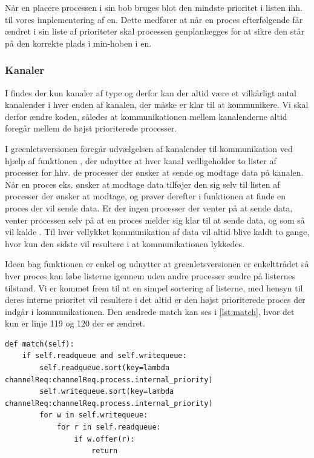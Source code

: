 Når \sched en placere processen i sin bob bruges blot den mindste prioritet i listen ihh. til vores implementering af \sched en. Dette medfører  at når en proces efterfølgende  får ændret i sin liste af prioriteter skal processen genplanlægges for at sikre den står på den korrekte plads i min-hoben i \sched en. 

\subsubsection*{Kanaler}
I \pycsp findes der kun kanaler af type  og derfor kan der altid  være et vilkårligt antal kanalender i hver enden af kanalen, der måske er klar til at kommunikere. Vi skal derfor ændre koden, således at kommunikationen mellem kanalenderne altid foregår mellem de højst prioriterede processer. 

I greenletsversionen foregår udvælgelsen af kanalender til kommunikation ved hjælp af funktionen , der udnytter at  hver kanal vedligeholder to lister af processer for hhv. de processer der ønsker at sende og modtage data på kanalen. Når en proces eks. ønsker at modtage data tilføjer den sig selv til listen af processer der ønsker at modtage, og prøver derefter i  funktionen at finde en proces der vil sende data. Er der ingen processer der venter på at sende data, venter processen selv  på at en proces melder sig klar til at sende data, og som så vil kalde . Til hver vellykket kommunikation af data vil  altid blive kaldt to gange, hvor kun den sidste vil resultere i at kommunikationen lykkedes.

Ideen bag funktionen  er enkel og  udnytter at greenletsversionen er enkelttrådet så hver proces kan løbe listerne igennem uden andre processer ændre på listernes tilstand.  Vi er kommet frem til at  en simpel sortering af listerne, med hensyn til deres interne prioritet vil resultere i det altid er den højst prioriterede proces der indgår i kommunikationen. Den ændrede match kan ses i \cref{lst:match}, hvor det kun er linje 119 og 120 der er ændret.

\begin{lstlisting}[firstnumber=117 ,float=hbtp, label=lst:match, caption=funktionen \code{match} der sorterer kanalrequests.]
def match(self):        
    if self.readqueue and self.writequeue:
        self.readqueue.sort(key=lambda channelReq:channelReq.process.internal_priority)
        self.writequeue.sort(key=lambda channelReq:channelReq.process.internal_priority)
        for w in self.writequeue:
            for r in self.readqueue:
                if w.offer(r):
                    return       
\end{lstlisting}

